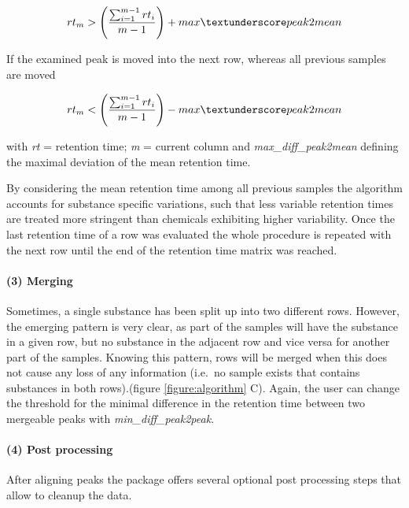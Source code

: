 \begin{equation}
rt_{m} > \left(\frac{\sum_{i=1}^{m-1}rt_{i}}{m-1}\right) + max\textunderscore peak2mean
\end{equation}

If the examined peak is moved into the next row, whereas all previous
samples are moved \par

\begin{equation}
rt_{m} < \left(\frac{\sum_{i=1}^{m-1}rt_{i}}{m-1}\right) - max\textunderscore peak2mean
\end{equation}

with \emph{rt} = retention time; \emph{m} = current column and
\emph{max\_diff\_peak2mean} defining the maximal deviation of the mean
retention time.

By considering the mean retention time among all previous samples the
algorithm accounts for substance specific variations, such that less
variable retention times are treated more stringent than chemicals
exhibiting higher variability. Once the last retention time of a row was
evaluated the whole procedure is repeated with the next row until the
end of the retention time matrix was reached.

\paragraph{(3) Merging}\label{merging}

Sometimes, a single substance has been split up into two different rows.
However, the emerging pattern is very clear, as part of the samples will
have the substance in a given row, but no substance in the adjacent row
and vice versa for another part of the samples. Knowing this pattern,
rows will be merged when this does not cause any loss of any information
(i.e.~no sample exists that contains substances in both rows).(figure
\ref{figure:algorithm} C). Again, the user can change the threshold for
the minimal difference in the retention time between two mergeable peaks
with \emph{min\_diff\_peak2peak}. \par 

\paragraph{(4) Post processing}\label{post-processing}

After aligning peaks the package offers several optional post processing
steps that allow to cleanup the data.

